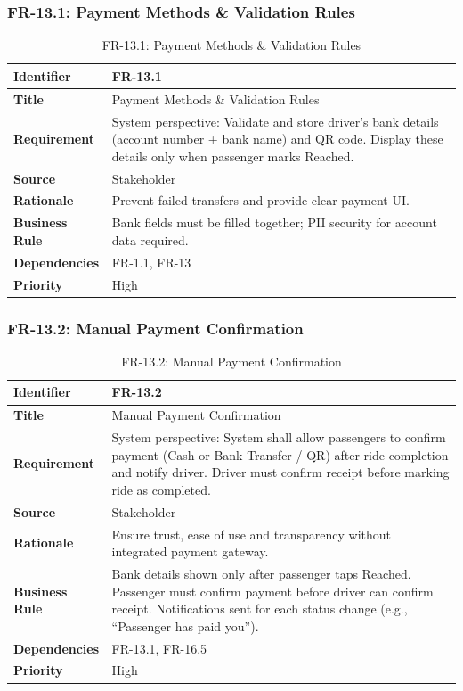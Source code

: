 \subsubsection{FR-13.1: Payment Methods \& Validation Rules}

\begin{longtable}{|p{3cm}|p{12cm}|}
\caption{FR-13.1: Payment Methods \& Validation Rules}
\label{tab:fr-13-1} \\
\hline
\rowcolor{lightgray!30}
\textbf{Identifier} & FR-13.1 \\
\hline
\textbf{Title} & Payment Methods \& Validation Rules \\
\hline
\textbf{Requirement} & System perspective: Validate and store driver's bank details (account number + bank name) and QR code. Display these details only when passenger marks Reached. \\
\hline
\textbf{Source} & Stakeholder \\
\hline
\textbf{Rationale} & Prevent failed transfers and provide clear payment UI. \\
\hline
\textbf{Business Rule} & Bank fields must be filled together; PII security for account data required. \\
\hline
\textbf{Dependencies} & FR-1.1, FR-13 \\
\hline
\textbf{Priority} & High \\
\hline
\end{longtable}

\subsubsection{FR-13.2: Manual Payment Confirmation}

\begin{longtable}{|p{3cm}|p{12cm}|}
\caption{FR-13.2: Manual Payment Confirmation}
\label{tab:fr-13-2} \\
\hline
\rowcolor{lightgray!30}
\textbf{Identifier} & FR-13.2 \\
\hline
\textbf{Title} & Manual Payment Confirmation \\
\hline
\textbf{Requirement} & System perspective: System shall allow passengers to confirm payment (Cash or Bank Transfer / QR) after ride completion and notify driver. Driver must confirm receipt before marking ride as completed. \\
\hline
\textbf{Source} & Stakeholder \\
\hline
\textbf{Rationale} & Ensure trust, ease of use and transparency without integrated payment gateway. \\
\hline
\textbf{Business Rule} & Bank details shown only after passenger taps Reached. Passenger must confirm payment before driver can confirm receipt. Notifications sent for each status change (e.g., ``Passenger has paid you''). \\
\hline
\textbf{Dependencies} & FR-13.1, FR-16.5 \\
\hline
\textbf{Priority} & High \\
\hline
\end{longtable}


